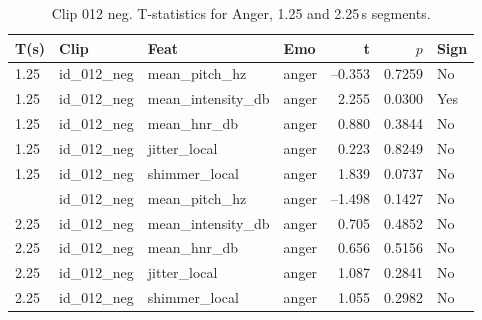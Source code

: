     \begin{table}
  \centering
  \begin{tabular}{l l l l r r l}
    \toprule
    T(s) & Clip           & Feat            & Emo & t & $p$ & Sign \\
    \midrule
    1.25  & id\_012\_neg & mean\_pitch\_hz     & anger   & –0.353      & 0.7259    & No  \\
    1.25  & id\_012\_neg & mean\_intensity\_db & anger   &  2.255      & 0.0300    & Yes \\
    1.25  & id\_012\_neg & mean\_hnr\_db       & anger   &  0.880      & 0.3844    & No  \\
    1.25  & id\_012\_neg & jitter\_local       & anger   &  0.223      & 0.8249    & No  \\
    1.25  & id\_012\_neg & shimmer\_local      & anger   &  1.839      & 0.0737    & No  \\
    \addlinespace
    2.25  & id\_012\_neg & mean\_pitch\_hz     & anger   & –1.498      & 0.1427    & No  \\
    2.25  & id\_012\_neg & mean\_intensity\_db & anger   &  0.705      & 0.4852    & No  \\
    2.25  & id\_012\_neg & mean\_hnr\_db       & anger   &  0.656      & 0.5156    & No  \\
    2.25  & id\_012\_neg & jitter\_local       & anger   &  1.087      & 0.2841    & No  \\
    2.25  & id\_012\_neg & shimmer\_local      & anger   &  1.055      & 0.2982    & No  \\
    \bottomrule
  \end{tabular}
  \caption{Clip 012 neg. T-statistics for Anger, 1.25 and 2.25\,s segments.}
  \label{tab:clip012_stats_t_test}
\end{table}

